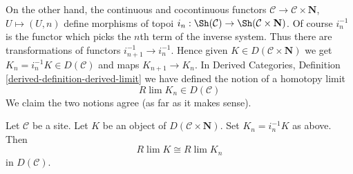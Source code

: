 \medskip\noindent
On the other hand, the continuous and cocontinuous functors
$\mathcal{C} \to \mathcal{C} \times \mathbf{N}$,
$U \mapsto (U, n)$ define morphisms of topoi
$i_n : \Sh(\mathcal{C}) \to \Sh(\mathcal{C} \times \mathbf{N})$.
Of course $i_n^{-1}$ is the functor which picks the $n$th term of
the inverse system. Thus there are transformations of functors
$i_{n + 1}^{-1} \to i_n^{-1}$. Hence given
$K \in D(\mathcal{C} \times \mathbf{N})$ we get
$K_n = i_n^{-1}K \in D(\mathcal{C})$ and maps $K_{n + 1} \to K_n$.
In Derived Categories, Definition \ref{derived-definition-derived-limit}
we have defined the notion of a homotopy limit
$$
R\lim K_n \in D(\mathcal{C})
$$
We claim the two notions agree (as far as it makes sense).

\begin{lemma}
\label{lemma-derived-limit-is-ok}
Let $\mathcal{C}$ be a site. Let $K$ be an object of
$D(\mathcal{C} \times \mathbf{N})$. Set $K_n = i_n^{-1}K$ as above.
Then
$$
R\lim K \cong R\lim K_n
$$
in $D(\mathcal{C})$.
\end{lemma}

